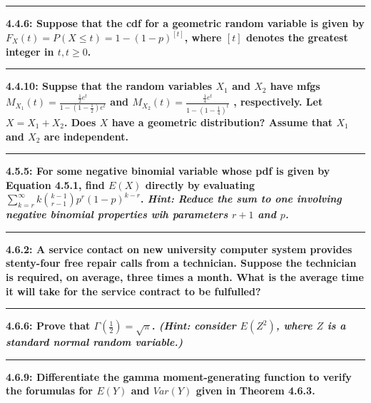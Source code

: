 \documentclass[11pt]{article}
\newcommand\question[2]{\vspace{.25in}\hrule\textbf{#1: #2}\vspace{.5em}\vspace{.10in}}
\begin{document}
\question{4.4.6}
{Suppose that the cdf for a geometric random variable is given by 
$F_{X}(t) = P(X \leq t) = 1 - (1-p)^{[t]}$, where $[t]$ denotes the greatest integer
in $t,t \geq 0$.}
\\


\question{4.4.10}
{Suppse that the random variables $X_{1}$ and $X_{2}$ have mfgs 
$M_{X_{1}}(t) = \frac{ \frac{1}{2}e^{t} }{1-(1-\frac{1}{2})e^{t}}$ 
and
$M_{X_{2}}(t) = \frac{ \frac{1}{4}e^{t} }{1-(1-\frac{1}{4})^{t}}$
, respectively. Let $X=X_{1}+X_{2}$. Does $X$ have a geometric distribution?
Assume that $X_{1}$ and $X_{2}$ are independent.}




\question{4.5.5}
{For some negative binomial variable whose pdf is given by Equation 4.5.1, find $E(X)$
directly by evaluating
$\sum_{k=r}^{\infty}k \binom{k-1}{r-1} p^{r}(1-p)^{k-r}$.
\emph{Hint: Reduce the sum to one involving negative binomial properties wih
parameters $r+1$ and $p$.}}


\question{4.6.2}
{A service contact on new university computer system provides stenty-four free repair
 calls from a technician. Suppose the technician is required, on average, three times
 a month. What is the average time it will take for the service contract to be 
 fulfulled?}


\question{4.6.6}
{Prove that $\Gamma (\frac{1}{2}) = \sqrt{\pi}$.
\emph{(Hint: consider $E(Z^{2})$, where $Z$ is a standard normal random variable.)}}


\question{4.6.9}
{Differentiate the gamma moment-generating function to verify the forumulas for
$E(Y)$ and $Var(Y)$ given in Theorem 4.6.3.}
\end{document}
